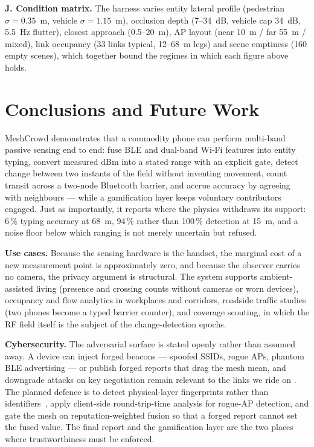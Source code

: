 \documentclass[journal,10pt]{IEEEtran}
\begin{document}
\textbf{J. Condition matrix.} The harness varies entity lateral profile
(pedestrian $\sigma = 0.35$~m, vehicle $\sigma = 1.15$~m), occlusion depth
(7--34~dB, vehicle cap 34~dB, 5.5~Hz flutter), closest approach (0.5--20~m), AP
layout (near 10~m / far 55~m / mixed), link occupancy (33 links typical,
12--68~m legs) and scene emptiness (160 empty scenes), which together bound the
regimes in which each figure above holds.

\section{Conclusions and Future Work}
MeshCrowd demonstrates that a commodity phone can perform multi-band passive
sensing end to end: fuse BLE and dual-band Wi-Fi features into entity typing,
convert measured dBm into a stated range with an explicit gate, detect change
between two instants of the field without inventing movement, count transit
across a two-node Bluetooth barrier, and accrue accuracy by agreeing with
neighbours --- while a gamification layer keeps voluntary contributors engaged.
Just as importantly, it reports where the physics withdraws its support: 6\,\%
typing accuracy at 68~m, 94\,\% rather than 100\,\% detection at 15~m, and a
noise floor below which ranging is not merely uncertain but refused.

\textbf{Use cases.} Because the sensing hardware is the handset, the marginal
cost of a new measurement point is approximately zero, and because the observer
carries no camera, the privacy argument is structural. The system supports
ambient-assisted living (presence and crossing counts without cameras or worn
devices), occupancy and flow analytics in workplaces and corridors, roadside
traffic studies (two phones become a typed barrier counter), and coverage
scouting, in which the RF field itself is the subject of the change-detection
epochs.

\textbf{Cybersecurity.} The adversarial surface is stated openly rather than
assumed away. A device can inject forged beacons --- spoofed SSIDs, rogue APs,
phantom BLE advertising --- or publish forged reports that drag the mesh mean,
and downgrade attacks on key negotiation remain relevant to the links we ride on
\cite{antonioli2020,cai2024,mobisys2024,hensler2019}. The planned defence is to
detect physical-layer fingerprints rather than
identifiers~\cite{cai2024,mobisys2024,hensler2019}, apply client-side
round-trip-time analysis for rogue-AP detection, and gate the mesh on
reputation-weighted fusion so that a forged report cannot set the fused value.
The final report and the gamification layer are the two places where
trustworthiness must be enforced.
\end{document}
